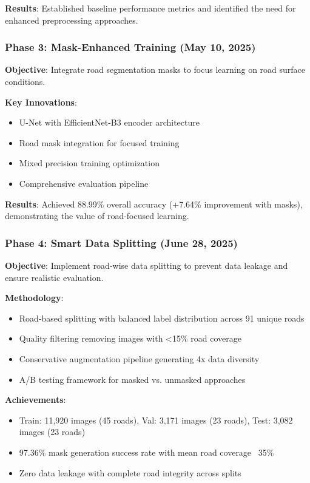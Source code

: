 \documentclass[12pt]{article}
\begin{document}
\textbf{Results}: Established baseline performance metrics and identified the need for enhanced preprocessing approaches.

\subsubsection{Phase 3: Mask-Enhanced Training (May 10, 2025)}

\textbf{Objective}: Integrate road segmentation masks to focus learning on road surface conditions.

\textbf{Key Innovations}:
\begin{itemize}[itemsep=1pt,parsep=0pt,topsep=2pt]
\item U-Net with EfficientNet-B3 encoder architecture
\item Road mask integration for focused training
\item Mixed precision training optimization
\item Comprehensive evaluation pipeline
\end{itemize}

\textbf{Results}: Achieved 88.99\% overall accuracy (+7.64\% improvement with masks), demonstrating the value of road-focused learning.

\subsubsection{Phase 4: Smart Data Splitting (June 28, 2025)}

\textbf{Objective}: Implement road-wise data splitting to prevent data leakage and ensure realistic evaluation.

\textbf{Methodology}:
\begin{itemize}[itemsep=1pt,parsep=0pt,topsep=2pt]
\item Road-based splitting with balanced label distribution across 91 unique roads
\item Quality filtering removing images with <15\% road coverage
\item Conservative augmentation pipeline generating 4x data diversity
\item A/B testing framework for masked vs. unmasked approaches
\end{itemize}

\textbf{Achievements}:
\begin{itemize}[itemsep=1pt,parsep=0pt,topsep=2pt]
\item Train: 11,920 images (45 roads), Val: 3,171 images (23 roads), Test: 3,082 images (23 roads)
\item 97.36\% mask generation success rate with mean road coverage ~35\%
\item Zero data leakage with complete road integrity across splits
\end{itemize}
\end{document}
